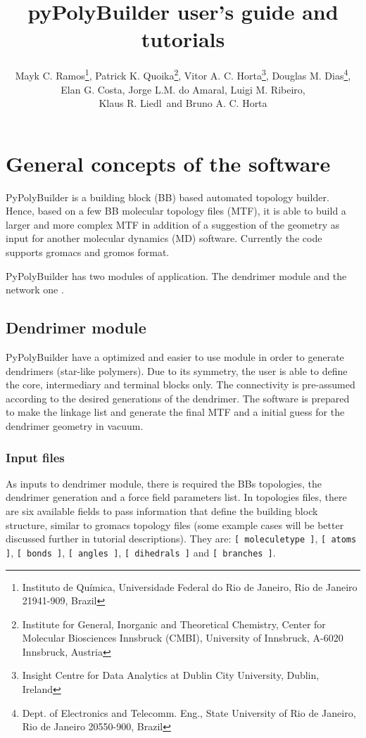 \documentclass[12pt]{article}
\title{pyPolyBuilder user's guide and tutorials}
\author{
	Mayk C. Ramos\thanks{Instituto de Qu\'imica, Universidade Federal do Rio de Janeiro, Rio de Janeiro 21941-909, Brazil},
	Patrick K. Quoika\thanks{Institute for General, Inorganic and Theoretical Chemistry, Center for Molecular Biosciences Innsbruck (CMBI), University of Innsbruck, A-6020 Innsbruck, Austria}, 
	Vitor A. C. Horta\thanks{Insight Centre for Data Analytics at Dublin City University, Dublin, Ireland},
	Douglas M. Dias\thanks{Dept. of Electronics and Telecomm. Eng., State University of Rio de Janeiro, Rio de Janeiro 20550-900, Brazil},\\
	Elan G. Costa\samethanks{},
	Jorge L.M. do Amaral\samethanks{},
	Luigi M. Ribeiro\samethanks{},\\
	Klaus R. Liedl\samethanks[2]\  and 
	Bruno A. C. Horta\samethanks[1]
}
\newcommand{\red}[1]{\color{red}{#1}}
\begin{document}
\maketitle

\begin{abstract}
\end{abstract}

\tableofcontents

\renewcommand{\baselinestretch}{1.5}
\normalsize

\section{General concepts of the software}

PyPolyBuilder is a building block (BB) based automated topology builder.
Hence, based on a few BB molecular topology files (MTF), it is able to build a larger and more complex MTF in addition of a suggestion of the geometry as input for another molecular dynamics (MD) software.
Currently the code supports gromacs and gromos format.

PyPolyBuilder has two modules of application. The dendrimer module and the network one {\red{(also referred to as the polymer module)}}. 

\subsection{Dendrimer module}
PyPolyBuilder have a optimized and easier to use module in order to generate dendrimers (star-like polymers).
Due to its symmetry, the user is able to define the core, intermediary and terminal blocks only.
The connectivity is pre-assumed according to the desired generations of the dendrimer.
The software is prepared to make the linkage list and generate the final MTF and a initial guess for the dendrimer geometry in vacuum.

\subsubsection{Input files}
\label{sec:DENDinputFiles}
As inputs to dendrimer module, there is required the BBs topologies, the dendrimer generation and a force field parameters list.
In topologies files, there are six available fields to pass information that define the building block structure, similar to gromacs topology files (some example cases will be better discussed further in tutorial descriptions).
They are: \texttt{[ moleculetype ]}, \texttt{[ atoms ]}, \texttt{[ bonds ]}, \texttt{[ angles ]}, \texttt{[ dihedrals ]} and \texttt{[ branches ]}.
\end{document}
